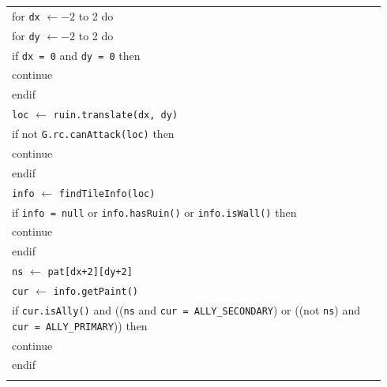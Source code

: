 \documentclass{article}
\newenvironment{pseudobox}
{
\centering
\begin{longtable}{|p{0.94\linewidth}|}
\hline
}
{
\\ \hline
\end{longtable}
\vspace{0.05cm}
}
\begin{document}
\begin{enumerate}[label=\alph*.]
\begin{enumerate}[label=\alph*.]
\begin{pseudobox}
\hspace*{1.5em}for \texttt{dx} $\leftarrow -2$ to 2 do \\
\hspace*{3em}for \texttt{dy} $\leftarrow -2$ to 2 do \\
\hspace*{4.5em}if \texttt{dx = 0} and \texttt{dy = 0} then \\
\hspace*{6em}continue \\
\hspace*{4.5em}endif \\

\hspace*{4.5em}\texttt{loc} $\leftarrow$ \texttt{ruin.translate(dx, dy)} \\

\hspace*{4.5em}if not \texttt{G.rc.canAttack(loc)} then \\
\hspace*{6em}continue \\
\hspace*{4.5em}endif \\

\hspace*{4.5em}\texttt{info} $\leftarrow$ \texttt{findTileInfo(loc)} \\
\hspace*{4.5em}if \texttt{info = null} or \texttt{info.hasRuin()} or \texttt{info.isWall()} then \\
\hspace*{6em}continue \\
\hspace*{4.5em}endif \\

\hspace*{4.5em}\texttt{ns} $\leftarrow$ \texttt{pat[dx+2][dy+2]} \\
\hspace*{4.5em}\texttt{cur} $\leftarrow$ \texttt{info.getPaint()} \\

\hspace*{4.5em}if \texttt{cur.isAlly()} and ((\texttt{ns} and \texttt{cur = ALLY\_SECONDARY}) or ((not \texttt{ns}) and \texttt{cur = ALLY\_PRIMARY})) then \\
\hspace*{6em}continue \\
\hspace*{4.5em}endif \\


\end{pseudobox}
\end{enumerate}
\end{enumerate}
\end{document}
